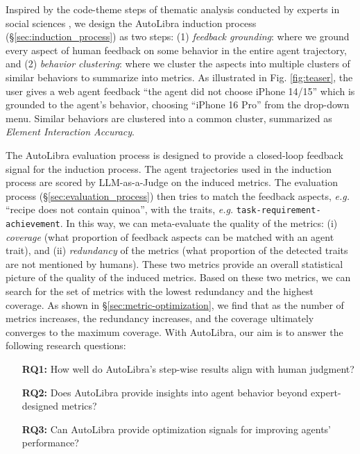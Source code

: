 Inspired by the code-theme steps of thematic analysis conducted by experts in
social sciences \citep{braun2006using}, we design the AutoLibra induction
process (\S\ref{sec:induction_process}) as two steps: (1) \emph{feedback
grounding}: where we ground every aspect of human feedback on some behavior in
the entire agent trajectory, and (2) \emph{behavior clustering}: where we cluster
the aspects into multiple clusters of similar behaviors to summarize into metrics.
As illustrated in Fig. \ref{fig:teaser}, the user gives a web agent feedback ``the
agent did not choose iPhone 14/15'' which is grounded to the agent's behavior, choosing
``iPhone 16 Pro'' from the drop-down menu. Similar behaviors are clustered into
a common cluster, summarized as \textit{Element Interaction Accuracy}.

The AutoLibra evaluation process is designed to provide a closed-loop feedback
signal for the induction process. The agent trajectories used in the induction process
are scored by LLM-as-a-Judge \citep{zheng2023judging} on the induced metrics. The
evaluation process (\S\ref{sec:evaluation_process}) then tries to match the
feedback aspects, \emph{e.g.} ``recipe does not contain quinoa'', with the traits,
\emph{e.g.} \texttt{task-requirement-achievement}. In this way, we can meta-evaluate
the quality of the metrics: (i) \emph{coverage} (what proportion of feedback aspects
can be matched with an agent trait), and (ii) \emph{redundancy} of the metrics (what
proportion of the detected traits are not mentioned by humans). These two metrics
provide an overall statistical picture of the quality of the induced metrics.
Based on these two metrics, we can search for the set of metrics with the lowest
redundancy and the highest coverage. As shown in \S\ref{sec:metric-optimization},
we find that as the number of metrics increases, the redundancy increases, and
the coverage ultimately converges to the maximum coverage. With AutoLibra, our
aim is to answer the following research questions:
\begin{itemize}
	\setlength{\itemsep}{0em}

	\item[\textbf{RQ1:}] How well do AutoLibra's step-wise results align with human
		judgment?

	\item[\textbf{RQ2:}] Does AutoLibra provide insights into agent behavior beyond
		expert-designed metrics?

	\item[\textbf{RQ3:}] Can AutoLibra provide optimization signals for
		improving agents' performance?
\end{itemize}

